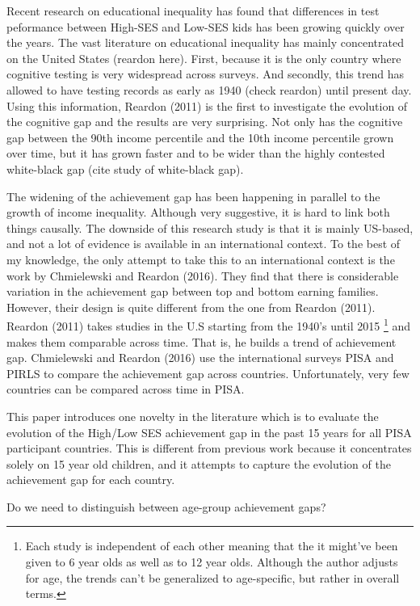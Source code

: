 \documentclass[11pt, a4paper]{article}\usepackage[]{graphicx}\usepackage[]{color}
\begin{document}




Recent research on educational inequality has found that differences in test peformance between High-SES and Low-SES kids has been growing quickly over the years. The vast literature on educational inequality has mainly concentrated on the United States (reardon here). First, because it is the only country where cognitive testing is very widespread across surveys. And secondly, this trend has allowed to have testing records as early as 1940 (check reardon) until present day. Using this information, Reardon (2011) is the first to investigate the evolution of the cognitive gap and the results are very surprising. Not only has the cognitive gap between the 90th income percentile and the 10th income percentile grown over time, but it has grown faster and to be wider than the highly contested white-black gap (cite study of white-black gap).

The widening of the achievement gap has been happening in parallel to the growth of income inequality. Although very suggestive, it is hard to link both things causally. The downside of this research study is that it is mainly US-based, and not a lot of evidence is available in an international context. To the best of my knowledge, the only attempt to take this to an international context is the work by Chmielewski and Reardon (2016). They find that there is considerable variation in the achievement gap between top and bottom earning families. However, their design is quite different from the one from Reardon (2011). Reardon (2011) takes studies in the U.S starting from the 1940's until 2015 \footnote{Each study is independent of each other meaning that the it might've been given to 6 year olds as well as to 12 year olds. Although the author adjusts for age, the trends can't be generalized to age-specific, but rather in overall terms.} and makes them comparable across time. That is, he builds a trend of achievement gap. Chmielewski and Reardon (2016) use the international surveys PISA and PIRLS to compare the achievement gap across countries. Unfortunately, very few countries can be compared across time in PISA.

This paper introduces one novelty in the literature which is to evaluate the evolution of the High/Low SES achievement gap in the past 15 years for all PISA participant countries. This is different from previous work because it concentrates solely on 15 year old children, and it attempts to capture the evolution of the achievement gap for each country. 

Do we need to distinguish between age-group achievement gaps?
\end{document}
